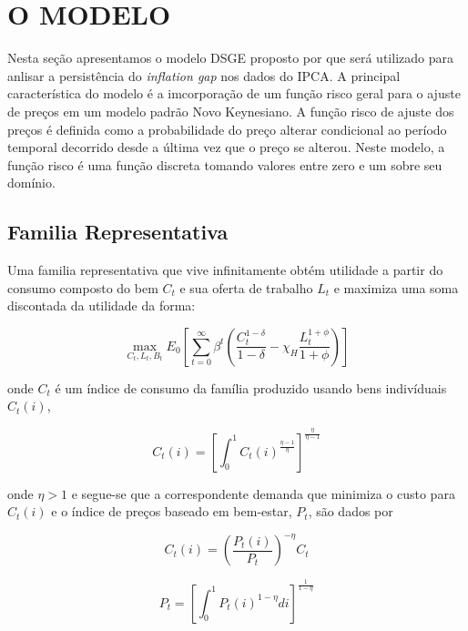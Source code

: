 \documentclass[twoside,a4paper,11pt]{report}
\begin{document}
\section*{O MODELO}

Nesta seção apresentamos o modelo DSGE proposto por \citet{yao2010can} que será utilizado para anlisar a persistência do \emph{inflation gap} nos dados do IPCA. A principal característica do modelo é a imcorporação de um função risco geral para o ajuste de preços em um modelo padrão Novo Keynesiano. A função risco de ajuste dos preços é definida como a probabilidade do preço alterar condicional ao período temporal decorrido desde a última vez que o preço se alterou. Neste modelo, a função risco é uma função discreta tomando valores entre zero e um sobre seu domínio. 

\subsection*{Familia Representativa}

Uma familia representativa que vive infinitamente obtém utilidade a partir do consumo composto do bem $C_{t}$ e sua oferta de trabalho $L_{t}$ e maximiza uma soma discontada da utilidade da forma:

\begin{equation}\label{eq02en03}
\max_{{{C}_{t},{L}_{t},{B}_{t}}}{{E}_{0}[\sum _{t=0}^{\infty}{{\beta}^{t}(\frac{{C}_{t}^{1-\delta}}{1-\delta}-{\chi}_{H}\frac{{L}_{t}^{1+\phi}}{1+\phi})}]} 
\end{equation}

\noindent onde $C_{t}$ é um índice de consumo da família produzido usando bens indivíduais $C_{t}(i)$, 

\begin{equation}\label{eq03en03}
{C}_{t}(i)={[\int _{0}^{1}{{C}_{t}{(i)}^{\frac{\eta -1}{\eta}}}]}^{\frac{\eta}{\eta -1}}
\end{equation}

\noindent onde $\eta>1$ e segue-se que a correspondente demanda que minimiza o custo para $C_{t}(i)$ e o índice de preços baseado em bem-estar, $P_{t}$, são dados por

\begin{equation}\label{eq04en03}
{C}_{t}(i)={(\frac{{P}_{t}(i)}{{P}_{t}})}^{-\eta}{C}_{t}
\end{equation}

\begin{equation}\label{eq05en03}
{P}_{t}={[\int _{0}^{1}{{P}_{t}{(i)}^{1-\eta}}di]}^{\frac{1}{1-\eta}}
\end{equation}
\end{document}
